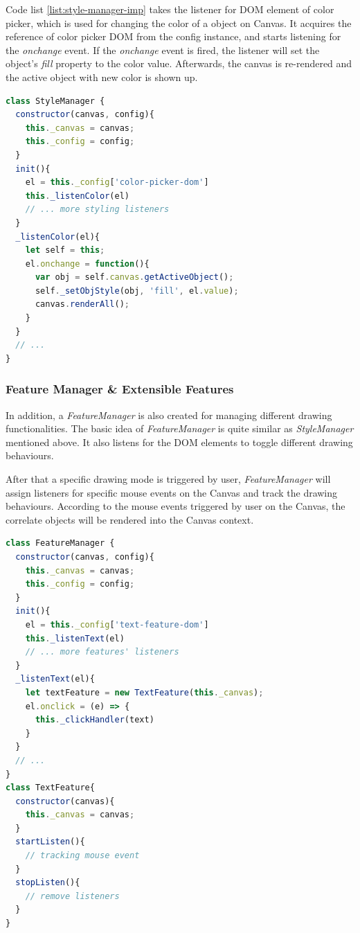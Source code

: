 Code list \ref{list:style-manager-imp} takes the listener for DOM element of color picker, which is used for changing the color of a object on Canvas. It acquires the reference of color picker DOM from the config instance, and starts listening for the \textit{onchange} event. If the \textit{onchange} event is fired, the listener will set the object's \textit{fill} property to the color value. Afterwards, the canvas is re-rendered and the active object with new color is shown up.

\begin{lstlisting}[language=JavaScript, caption=Main process of StyleManager, label={list:style-manager-imp}]
class StyleManager {
  constructor(canvas, config){
    this._canvas = canvas;
    this._config = config;
  }
  init(){
    el = this._config['color-picker-dom']
    this._listenColor(el)
    // ... more styling listeners
  }
  _listenColor(el){
    let self = this;
    el.onchange = function(){
      var obj = self.canvas.getActiveObject();
      self._setObjStyle(obj, 'fill', el.value);
      canvas.renderAll();
    }
  }
  // ...
}
\end{lstlisting}


\subsubsection{Feature Manager \& Extensible Features}

In addition, a \textit{FeatureManager} is also created for managing different drawing functionalities. The basic idea of \textit{FeatureManager} is quite similar as \textit{StyleManager} mentioned above. It also listens for the DOM elements to toggle different drawing behaviours.

After that a specific drawing mode is triggered by user, \textit{FeatureManager} will assign listeners for specific mouse events on the Canvas and track the drawing behaviours. According to the mouse events triggered by user on the Canvas, the correlate objects will be rendered into the Canvas context.

\begin{lstlisting}[language=JavaScript, caption=Main process of FeatureManager, label={list:feature-manager-imp}]
class FeatureManager {
  constructor(canvas, config){
    this._canvas = canvas;
    this._config = config;
  }
  init(){
    el = this._config['text-feature-dom']
    this._listenText(el)
    // ... more features' listeners
  }
  _listenText(el){
    let textFeature = new TextFeature(this._canvas);
    el.onclick = (e) => { 
      this._clickHandler(text)
    }
  }
  // ...
}
class TextFeature{
  constructor(canvas){
    this._canvas = canvas;
  }
  startListen(){
    // tracking mouse event
  }
  stopListen(){
    // remove listeners
  }
}
\end{lstlisting}

